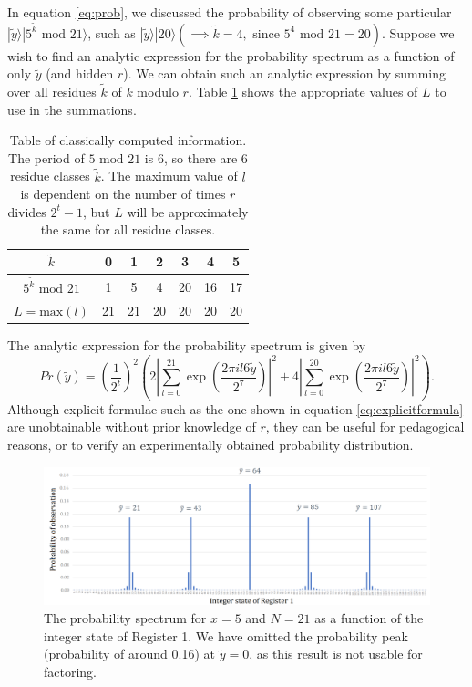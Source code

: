 \documentclass{article}
\begin{document}
In equation \eqref{eq:prob}, we discussed the probability of observing some particular 
$|\widetilde{y}\rangle|5^{\widetilde{k}} \text{ mod }21\rangle$, such as $|\widetilde{y}\rangle|20\rangle (\implies \widetilde{k} = 4, \text{ since } 5^4 \text{ mod } 21 = 20)$. Suppose we wish to find an analytic expression for the probability spectrum as a function of only $\widetilde{y}$ (and hidden $r$). We can obtain such an analytic expression by summing over all residues $\widetilde{k}$ of $k$ modulo $r$. Table \ref{table:table1} shows the appropriate values of $L$ to use in the summations. 

\begin{table}[!htbp]
\centering
\begin{tabular}{|c|c|c|c|c|c|c|}
\hline
$\widetilde{k}$ & 0 & 1 & 2 & 3 & 4 & 5 \\ \hline
$5^{\widetilde{k}} \text{ mod } 21$ & 1 & 5 & 4 & 20 & 16 & 17 \\ \hline
$L=\text{max}(l)$ & 21 & 21 & 20 & 20 & 20 & 20 \\
\hline
\end{tabular}
\captionsetup{format=hang}
\caption{Table of classically computed information. The period of $5 \text{ mod }21$ is 6, so there are 6 residue classes $\widetilde{k}$. The maximum value of $l$ is dependent on the number of times $r$ divides $2^t-1$, but $L$ will be approximately the same for all residue classes.}
\label{table:table1}
\end{table}
The analytic expression for the probability spectrum is given by 
\begin{equation}
\label{eq:explicitformula}
Pr(\widetilde{y}) = \left(\dfrac{1}{2^t}\right)^2\left(2\left|\sum_{l=0}^{21}\exp\left(\dfrac{2\pi il6\widetilde{y}}{2^7}\right)  \right|^2  + 4\left|\sum_{l=0}^{20}\exp\left(\dfrac{2\pi il6\widetilde{y}}{2^7}\right) \right|^2 \right).
\end{equation}
Although explicit formulae such as the one shown in equation \eqref{eq:explicitformula} are unobtainable without prior knowledge of $r$, they can be useful for pedagogical reasons, or to verify an experimentally obtained probability distribution.
\begin{figure}[!htbp]
\centering
\includegraphics[width=1\textwidth]
{p_spectrum.png}
\captionsetup{format = hang}
\caption{The probability spectrum for $x=5$ and $N=21$ as a function of the integer state of Register 1. We have omitted the probability peak (probability of around 0.16) at $\widetilde{y} = 0$, as this result is not usable for factoring.}
\label{fig:probspectrum}
\end{figure}
\end{document}

